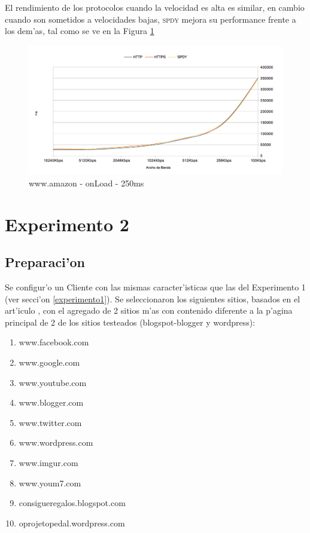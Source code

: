 \documentclass[a4paper,11pt,twocolumn]{article}
\begin{document}
El rendimiento de los protocolos cuando la velocidad es alta es similar, en cambio cuando son sometidos a velocidades bajas, \textsc{spdy} mejora su performance frente a los dem'as, tal como se ve en la Figura \ref{graf6}

\begin{figure}[ht]
  	\centering
	\includegraphics[scale=0.65]{exp1_6}
	\caption{\small www.amazon - onLoad - 250ms}
	\label{graf6}
\end{figure}

\section{Experimento 2}
\label{experimento2}
\subsection{Preparaci'on}

Se configur'o un Cliente con las mismas caracter'isticas que las del Experimento 1 (ver secci'on \ref{experimento1}). Se seleccionaron los siguientes sitios, basados en el art'iculo \cite{effectSPDY}, con el agregado de 2 sitios m'as con contenido diferente a la p'agina principal de 2 de los sitios testeados (blogspot-blogger y wordpress):
\begin{enumerate}
\item www.facebook.com
\item www.google.com
\item www.youtube.com
\item www.blogger.com
\item www.twitter.com
\item www.wordpress.com
\item www.imgur.com
\item www.youm7.com
\item consigueregalos.blogspot.com
\item oprojetopedal.wordpress.com
\end{enumerate}
\end{document}
